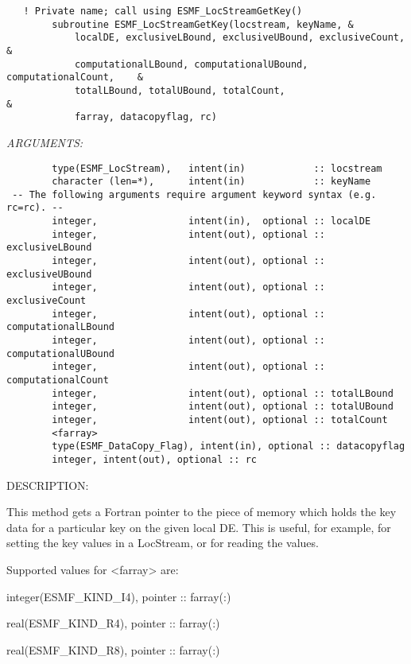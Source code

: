  
\begin{verbatim}   ! Private name; call using ESMF_LocStreamGetKey()
        subroutine ESMF_LocStreamGetKey(locstream, keyName, &
            localDE, exclusiveLBound, exclusiveUBound, exclusiveCount,       &
            computationalLBound, computationalUBound, computationalCount,    &
            totalLBound, totalUBound, totalCount,                            &
            farray, datacopyflag, rc)\end{verbatim}{\em ARGUMENTS:}
\begin{verbatim}        type(ESMF_LocStream),   intent(in)            :: locstream
        character (len=*),      intent(in)            :: keyName
 -- The following arguments require argument keyword syntax (e.g. rc=rc). --
        integer,                intent(in),  optional :: localDE
        integer,                intent(out), optional :: exclusiveLBound
        integer,                intent(out), optional :: exclusiveUBound
        integer,                intent(out), optional :: exclusiveCount
        integer,                intent(out), optional :: computationalLBound
        integer,                intent(out), optional :: computationalUBound
        integer,                intent(out), optional :: computationalCount
        integer,                intent(out), optional :: totalLBound
        integer,                intent(out), optional :: totalUBound
        integer,                intent(out), optional :: totalCount
        <farray>
        type(ESMF_DataCopy_Flag), intent(in), optional :: datacopyflag
        integer, intent(out), optional :: rc\end{verbatim}
{\sf DESCRIPTION:\\ }


      This method gets a Fortran pointer to the piece of memory which holds the 
      key data for a particular key on the given local DE. 
      This is useful, for example, for setting the key values in a LocStream, or
      for reading the values. 
  
      Supported values for <farray> are:
      \begin{description}
      \item integer(ESMF\_KIND\_I4), pointer :: farray(:)
      \item real(ESMF\_KIND\_R4), pointer :: farray(:)
      \item real(ESMF\_KIND\_R8), pointer :: farray(:)
      \end{description}
  
